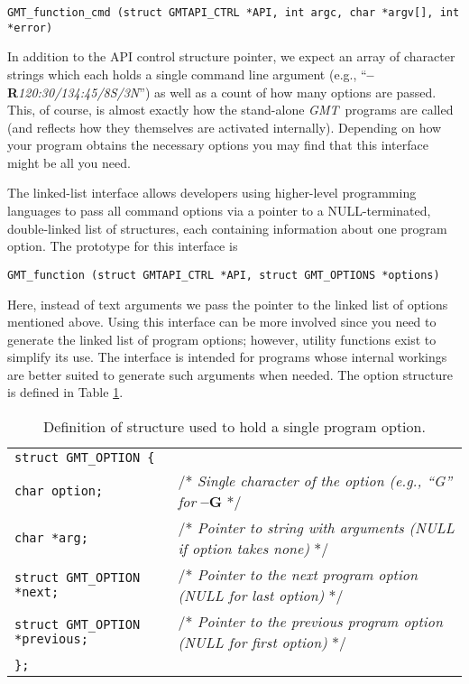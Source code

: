 \documentclass{report}
\newcommand{\GMT}{\textit{GMT}}%
\newcommand{\GMT}{\htmladdnormallink{\texttt{[image: eps/GMT\_glyph10.eps]}}{http://gmt.soest.hawaii.edu}}%
\newcommand{\Opt}[1]{{\bf --#1}}%
\newcommand{\GMT}{\htmladdnormallink{\textbf{GMT}}{http://gmt.soest.hawaii.edu}}%
\newcommand{\Opt}[1]{{\bf -#1}}%
\begin{document}
\begin{verbatim}
GMT_function_cmd (struct GMTAPI_CTRL *API, int argc, char *argv[], int *error)
\end{verbatim}
In addition to the API control structure pointer, we expect an array of character strings which each
holds a single command line argument (e.g., ``\Opt{R}{\it 120:30/134:45/8S/3N}'') as well as a count
of how many options are passed.  This, of course, is almost exactly how the stand-alone \GMT\
programs are called (and reflects how they themselves are activated internally).  Depending on how
your program obtains the necessary options you may find that this interface might be all
you need.

The linked-list interface allows developers using higher-level programming languages to pass all command
options via a pointer to a NULL-terminated, double-linked list of structures, each containing
information about one program option.  The prototype for this interface is

\begin{verbatim}
GMT_function (struct GMTAPI_CTRL *API, struct GMT_OPTIONS *options)
\end{verbatim}
Here, instead of text arguments we pass the pointer to the linked list of options mentioned above.  Using
this interface can be more involved since you need to generate the linked
list of program options; however, utility functions exist to simplify its use.
The interface is intended for programs whose internal workings are better suited to
generate such arguments when needed.  The option structure is defined in Table \ref{tbl:options}.
\begin{table}[h]
\small
\centering
\begin{tabular}{ll}
\multicolumn{2}{l}{\texttt{struct GMT\_OPTION \{}} \\
\texttt{char option;}			&       /* {\it Single character of the option (e.g., ``G'' for} \Opt{G} */ \\
\texttt{char *arg;}			&       /* {\it Pointer to string with arguments (NULL if option takes none)} */ \\
\texttt{struct GMT\_OPTION *next;}	&       /* {\it Pointer to the next program option (NULL for last option)}  */\\ 
\texttt{struct GMT\_OPTION *previous;}	&       /* {\it Pointer to the previous program option (NULL for first option)}  */\\ 
\texttt{\};}	&        \\
\end{tabular}
\caption{Definition of structure used to hold a single program option.}
\label{tbl:options}
\end{table}
\end{document}
